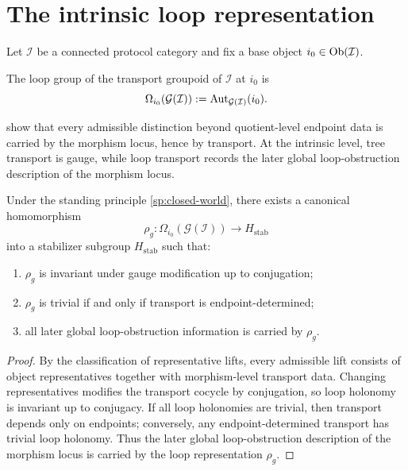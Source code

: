 \section{The intrinsic loop representation}
\label{sec:em-loop-representation}
Let \(\mathcal I\) be a connected protocol category and fix a base object
\(i_0\in\operatorname{Ob}(\mathcal I)\).
\begin{definition}
	The loop group of the transport groupoid of \(\mathcal I\) at \(i_0\) is
	\[
		\Omega_{i_0}(\mathcal G(\mathcal I)):=\operatorname{Aut}_{\mathcal G(\mathcal I)}(i_0).
	\]
\end{definition}
 show that every
admissible
distinction beyond quotient-level endpoint data is carried by the
morphism locus, hence by transport.
At the intrinsic level, tree transport is gauge, while loop transport
records the later global loop-obstruction description of the morphism
locus.
\begin{theorem}
	Under the standing principle \cref{sp:closed-world}, there exists a
	canonical homomorphism
	\[
		\rho_g:\Omega_{i_0}(\mathcal G(\mathcal I))\longrightarrow H_{\mathrm{stab}}
	\]
	into a stabilizer subgroup \(H_{\mathrm{stab}}\) such that:
	\begin{enumerate}
		\item
		      \(\rho_g\) is invariant under gauge modification up to conjugation;
		\item
		      \(\rho_g\) is trivial if and only if transport is endpoint-determined;
		\item
		      all later global loop-obstruction information is carried by
		      \(\rho_g\).
	\end{enumerate}
\end{theorem}
\begin{proof}
	By the classification of representative lifts, every admissible lift
	consists of object representatives together with morphism-level
	transport data.
	Changing representatives modifies the transport cocycle by conjugation,
	so loop holonomy is invariant up to conjugacy.
	If all loop holonomies are trivial, then transport depends only on
	endpoints; conversely, any endpoint-determined transport has trivial
	loop holonomy.
	Thus the later global loop-obstruction description of the morphism
	locus is carried by the loop representation \(\rho_g\).
\end{proof}
